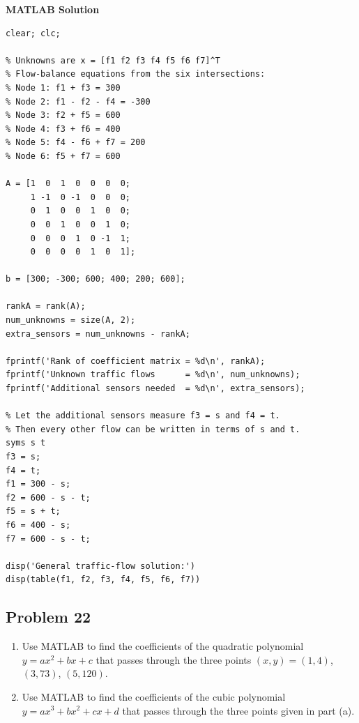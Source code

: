 \documentclass[12pt]{article}
\newcommand{\questiontitle}[2]{%
    \phantomsection
    \hypertarget{#1}{}%
    \subsection*{#2}
}
\newcommand{\solutiontitle}{\noindent\textbf{MATLAB Solution}}
\begin{document}
\solutiontitle
\begin{lstlisting}
clear; clc;

% Unknowns are x = [f1 f2 f3 f4 f5 f6 f7]^T
% Flow-balance equations from the six intersections:
% Node 1: f1 + f3 = 300
% Node 2: f1 - f2 - f4 = -300
% Node 3: f2 + f5 = 600
% Node 4: f3 + f6 = 400
% Node 5: f4 - f6 + f7 = 200
% Node 6: f5 + f7 = 600

A = [1  0  1  0  0  0  0;
     1 -1  0 -1  0  0  0;
     0  1  0  0  1  0  0;
     0  0  1  0  0  1  0;
     0  0  0  1  0 -1  1;
     0  0  0  0  1  0  1];

b = [300; -300; 600; 400; 200; 600];

rankA = rank(A);
num_unknowns = size(A, 2);
extra_sensors = num_unknowns - rankA;

fprintf('Rank of coefficient matrix = %d\n', rankA);
fprintf('Unknown traffic flows      = %d\n', num_unknowns);
fprintf('Additional sensors needed  = %d\n', extra_sensors);

% Let the additional sensors measure f3 = s and f4 = t.
% Then every other flow can be written in terms of s and t.
syms s t
f3 = s;
f4 = t;
f1 = 300 - s;
f2 = 600 - s - t;
f5 = s + t;
f6 = 400 - s;
f7 = 600 - s - t;

disp('General traffic-flow solution:')
disp(table(f1, f2, f3, f4, f5, f6, f7))
\end{lstlisting}

\questiontitle{tut8-q22}{Problem 22}
\begin{enumerate}[label=\alph*.]
    \item Use MATLAB to find the coefficients of the quadratic polynomial $y = ax^{2} + bx + c$ that passes through the three points $(x,y) = (1,4)$, $(3,73)$, $(5,120)$.
    \item Use MATLAB to find the coefficients of the cubic polynomial $y = ax^{3} + bx^{2} + cx + d$ that passes through the three points given in part (a).
\end{enumerate}
\end{document}
